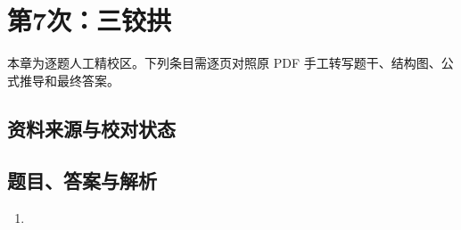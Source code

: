 \chapter{第7次：三铰拱}

本章为逐题人工精校区。下列条目需逐页对照原 PDF 手工转写题干、结构图、公式推导和最终答案。

\section{资料来源与校对状态}


\section{题目、答案与解析}

\begin{enumerate}[label=\textbf{第\arabic*题},wide]
  \item
  \begin{problemBox}
  \end{problemBox}

  \begin{solutionBox}
  \end{solutionBox}
\end{enumerate}
